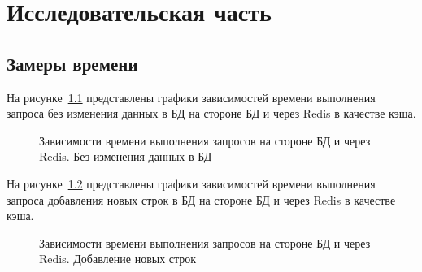 \chapter{Исследовательская часть}


\section{Замеры времени}

На рисунке~\ref{p1} представлены графики зависимостей времени выполнения запроса без изменения данных в БД на стороне БД и через Redis в качестве кэша.

\begin{figure}[ht]
\caption{Зависимости времени выполнения запросов на стороне БД и через Redis. Без изменения данных в БД}
\label{p1}
\end{figure}

\clearpage
На рисунке~\ref{p2} представлены графики зависимостей времени выполнения запроса добавления новых строк в БД на стороне БД и через Redis в качестве кэша.

\begin{figure}[ht]
	\caption{Зависимости времени выполнения запросов на стороне БД и через Redis. Добавление новых строк}
	\label{p2}
\end{figure}
\clearpage

